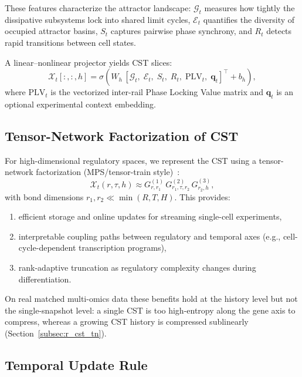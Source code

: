 \documentclass[preprint,12pt,amsmath,amssymb,superscriptaddress,floatfix]{revtex4-2}
\begin{document}
These features characterize the attractor landscape: $\mathcal{G}_t$
measures how tightly the dissipative subsystems lock into shared limit
cycles, $\mathcal{E}_t$ quantifies the diversity of occupied attractor
basins, $S_t$ captures pairwise phase synchrony, and $R_t$ detects
rapid transitions between cell states.

A linear--nonlinear projector yields CST slices:
\begin{equation}
    \mathcal{X}_t[:,:,h] = \sigma\!\left(W_h\,[\mathcal{G}_t,\;
    \mathcal{E}_t,\;S_t,\;R_t,\;\mathrm{PLV}_t,\;\mathbf{q}_t]^\top
    + b_h\right),
    \label{eq:cst_projection}
\end{equation}
where $\mathrm{PLV}_t$ is the vectorized inter-rail Phase Locking Value
matrix and $\mathbf{q}_t$ is an optional experimental context embedding.

\subsection{Tensor-Network Factorization of CST}

For high-dimensional regulatory spaces, we represent the CST using a
tensor-network factorization (MPS/tensor-train
style)~\cite{ref_orus2014}:
\begin{equation}
    \mathcal{X}_t(r,\tau,h) \approx
    G^{(1)}_{r,r_1}\,G^{(2)}_{r_1,\tau,r_2}\,G^{(3)}_{r_2,h},
    \label{eq:cst_mps}
\end{equation}
with bond dimensions $r_1, r_2 \ll \min(R,T,H)$.  This provides:
\begin{enumerate}
    \item efficient storage and online updates for streaming single-cell
    experiments,
    \item interpretable coupling paths between regulatory and temporal
    axes (e.g., cell-cycle-dependent transcription programs),
    \item rank-adaptive truncation as regulatory complexity changes
    during differentiation.
\end{enumerate}
On real matched multi-omics data these benefits hold at the history level but
not the single-snapshot level: a single CST is too high-entropy along the gene
axis to compress, whereas a growing CST history is compressed sublinearly
(Section~\ref{subsec:r_cst_tn}).

\subsection{Temporal Update Rule}
\end{document}
